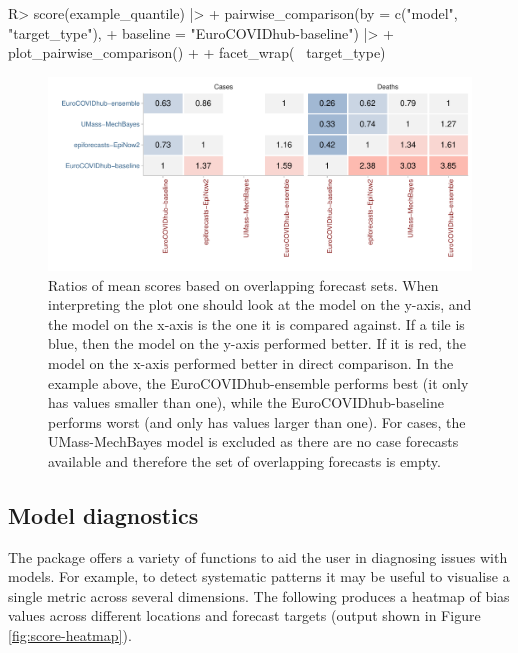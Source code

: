 \documentclass[
]{jss}
\begin{document}
\begin{CodeChunk}
\begin{CodeInput}
R> score(example_quantile) |>
+   pairwise_comparison(by = c("model", "target_type"), 
+                       baseline = "EuroCOVIDhub-baseline") |>
+   plot_pairwise_comparison() + 
+   facet_wrap(~ target_type)
\end{CodeInput}
\begin{figure}

{\centering \includegraphics[width=1\linewidth]{manuscript_files/figure-latex/pairwise-plot-1} 

}

\caption[Ratios of mean scores based on overlapping forecast sets]{Ratios of mean scores based on overlapping forecast sets. When interpreting the plot one should look at the model on the y-axis, and the model on the x-axis is the one it is compared against. If a tile is blue, then the model on the y-axis performed better. If it is red, the model on the x-axis performed better in direct comparison. In the example above, the EuroCOVIDhub-ensemble performs best (it only has values smaller than one), while the EuroCOVIDhub-baseline performs worst (and only has values larger than one). For cases, the UMass-MechBayes model is excluded as there are no case forecasts available and therefore the set of overlapping forecasts is empty.}\label{fig:pairwise-plot}
\end{figure}
\end{CodeChunk}

\hypertarget{model-diagnostics}{%
\subsection{Model diagnostics}\label{model-diagnostics}}

The  package offers a variety of functions to aid the
user in diagnosing issues with models. For example, to detect systematic
patterns it may be useful to visualise a single metric across several
dimensions. The following produces a heatmap of bias values across
different locations and forecast targets (output shown in Figure
\ref{fig:score-heatmap}).
\end{document}
